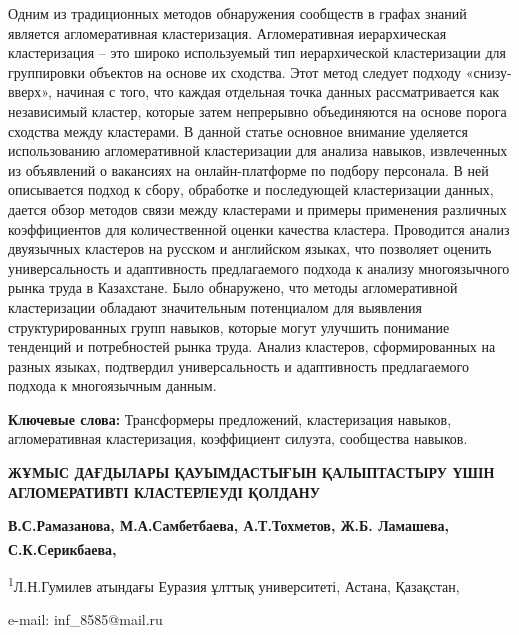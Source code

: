 Одним из традиционных методов обнаружения сообществ в графах знаний
является агломеративная кластеризация. Агломеративная иерархическая
кластеризация -- это широко используемый тип иерархической кластеризации
для группировки объектов на основе их сходства. Этот метод следует
подходу «снизу-вверх», начиная с того, что каждая отдельная точка данных
рассматривается как независимый кластер, которые затем непрерывно
объединяются на основе порога сходства между кластерами. В данной статье
основное внимание уделяется использованию агломеративной кластеризации
для анализа навыков, извлеченных из объявлений о вакансиях на
онлайн-платформе по подбору персонала. В ней описывается подход к сбору,
обработке и последующей кластеризации данных, дается обзор методов связи
между кластерами и примеры применения различных коэффициентов для
количественной оценки качества кластера. Проводится анализ двуязычных
кластеров на русском и английском языках, что позволяет оценить
универсальность и адаптивность предлагаемого подхода к анализу
многоязычного рынка труда в Казахстане. Было обнаружено, что методы
агломеративной кластеризации обладают значительным потенциалом для
выявления структурированных групп навыков, которые могут улучшить
понимание тенденций и потребностей рынка труда. Анализ кластеров,
сформированных на разных языках, подтвердил универсальность и
адаптивность предлагаемого подхода к многоязычным данным.

{\bfseries Ключевые слова:} Трансформеры предложений, кластеризация
навыков, агломеративная кластеризация, коэффициент силуэта, сообщества
навыков.

{\bfseries ЖҰМЫС ДАҒДЫЛАРЫ ҚАУЫМДАСТЫҒЫН ҚАЛЫПТАСТЫРУ ҮШІН АГЛОМЕРАТИВТІ
КЛАСТЕРЛЕУДІ ҚОЛДАНУ}

{\bfseries В.С.Рамазанова, М.А.Самбетбаева, А.Т.Тохметов, Ж.Б. Ламашева,
С.К.Серикбаева\textsuperscript{\envelope },}

\textsuperscript{1}Л.Н.Гумилев атындағы Еуразия ұлттық университеті,
Астана, Қазақстан,

e-mail: inf\_8585@mail.ru

